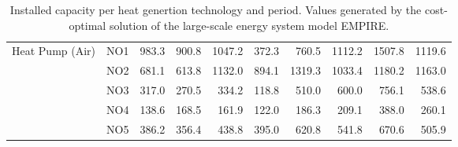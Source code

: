 \begin{table}[h]
{\begin{tabular}{llrrrrrrrr}
			\multirow{5}{*}{Heat Pump (Air)} & NO1 & 983.3 & 900.8 & 1047.2 & 372.3 & 760.5 & 1112.2 & 1507.8 & 1119.6\\
			& NO2 & 681.1 & 613.8 & 1132.0 & 894.1 & 1319.3 & 1033.4 & 1180.2 & 1163.0\\
			& NO3 & 317.0 & 270.5 & 334.2 & 118.8 & 510.0 & 600.0 & 756.1 & 538.6\\
			& NO4 & 138.6 & 168.5 & 161.9 & 122.0 & 186.3 & 209.1 & 388.0 & 260.1\\
			& NO5 & 386.2 & 356.4 & 438.8 & 395.0 & 620.8 & 541.8 & 670.6 & 505.9\\		
			
			\bottomrule
	\end{tabular}}
	\caption{Installed capacity per heat genertion technology and period. Values generated by the cost-optimal solution of the large-scale energy system model EMPIRE.}
	\label{tab:InstalledCap}
\end{table}

